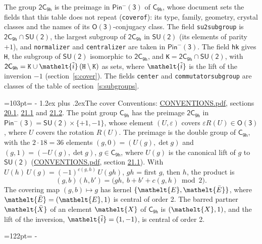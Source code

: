 \documentclass[10pt,a4paper]{article}
\makeatletter
\renewcommand\section{\@startsection{section}{1}{\z@}{-3ex plus -1ex minus -.2ex}%
  {1.2ex plus .2ex}{\normalfont\large\sffamily\bfseries\color{parttitle}}}
\newcommand{\needspace}[1]{\par\penalty-100\begingroup\dimen0=#1\relax\dimen2=\pagegoal
  \advance\dimen2-\pagetotal\ifdim\dimen0>\dimen2\relax\ifdim\dimen2>0pt\vfil\break\fi\fi
  \endgroup}
\numberwithin{equation}{section}
\newcommand{\eltfont}[1]{{\let\sigma\eltsigma\mathelt{#1}}}
\newcommand{\grp}[1]{\mathsf{#1}}
\newcommand{\elt}[1]{\eltfont{#1}}
\newcommand{\dirprod}{\times}
\newcommand{\barred}[1]{\bar{#1}}
\newcommand{\lift}[1]{\tilde{#1}}
\makeatother
\begin{document}
\leavevmode\label{n:element.inversion}\label{n:group.preimage}The group $\grp{2C_{9h}}$ is the preimage in $\grp{Pin^{-}(3)}$ of \href{../../../rotation/data/pdf/C9h.pdf}{$\grp{C_{9h}}$}, whose document sets the fields that this table does not repeat (\texttt{coverof}): its type, family, geometry, crystal classes and the names of its \href{../../../rotation/data/pdf/O3.pdf}{$\grp{O(3)}$}-conjugacy class. The field \texttt{su2subgroup} is $\grp{2C_{9h}} \cap \grp{SU(2)}$, the largest subgroup of $\grp{2C_{9h}}$ in $\grp{SU(2)}$ (its elements of parity $+1$), and \texttt{normalizer} and \texttt{centralizer} are taken in $\grp{Pin^{-}(3)}$. The field \texttt{hk} gives \texttt{H}, the subgroup of $\grp{SU(2)}$ isomorphic to $\grp{2C_{9h}}$, and \texttt{K}${} = \grp{2C_{9h}} \cap \grp{SU(2)}$, with $\grp{2C_{9h}} = \texttt{K} \cup \elt{\lift{i}}\,(\texttt{H} \setminus \texttt{K})$ as sets, where $\elt{\lift{i}}$ is the lift of the inversion $-1$ (section~\ref{s:cover}). The fields \texttt{center} and \texttt{commutatorsubgroup} are classes of the table of section~\ref{s:subgroups}.
\needspace{103pt}
\section{The cover}\label{s:cover}
Conventions: \href{../../CONVENTIONS.pdf}{CONVENTIONS.pdf}, sections \href{../../CONVENTIONS.pdf\#conv.20.1}{20.1}, \href{../../CONVENTIONS.pdf\#conv.21.1}{21.1} and \href{../../CONVENTIONS.pdf\#conv.21.2}{21.2}.
\leavevmode\label{n:group.pin.minus}\label{n:group.su2}\label{n:local.pin.sign}\label{n:matrix.covered}\label{n:matrix.lift.su2}\label{n:index.bar}The point group $\grp{C_{9h}}$ has the preimage $\grp{2C_{9h}}$ in $\grp{Pin^{-}(3)} = \grp{SU(2)} \dirprod \{+1, -1\}$, whose element $(U, \varepsilon)$ covers $\varepsilon R(U) \in \grp{O(3)}$, where $U$ covers the rotation $R(U)$. The preimage is the double group of $\grp{C_{9h}}$, with the $2 \cdot 18 = 36$ elements $(g, 0) = (U(g), \det g)$ and $(g, 1) = (-U(g), \det g)$, $g \in \grp{C_{9h}}$, where $U(g)$ is the canonical lift of $g$ to $\grp{SU(2)}$ (\href{../../CONVENTIONS.pdf}{CONVENTIONS.pdf}, section \href{../../CONVENTIONS.pdf\#conv.21.1}{21.1}). \label{n:function.cocycle}With $U(h)\,U(g) = (-1)^{c(g,h)}\,U(gh)$, $gh$ = first $g$, then $h$, the product is
\begin{equation}\label{e:product}(g, b)(h, b') = \bigl(gh,\ b + b' + c(g, h) \bmod 2\bigr).\end{equation}
\leavevmode\label{n:mark.bar}The covering map $(g, b) \mapsto g$ has kernel $\{\elt{E}, \elt{\barred{E}}\}$, where $\elt{\barred{E}} = (\elt{E}, 1)$ is central of order 2. \label{n:element.named}\label{n:mark.lift}The barred partner $\elt{\barred{X}}$ of an element $\elt{X}$ of $\grp{C_{9h}}$ is $(\elt{X}, 1)$, and the lift of the inversion, $\elt{\lift{i}} = (1, -1)$, is central of order 2.
\needspace{122pt}
\end{document}
